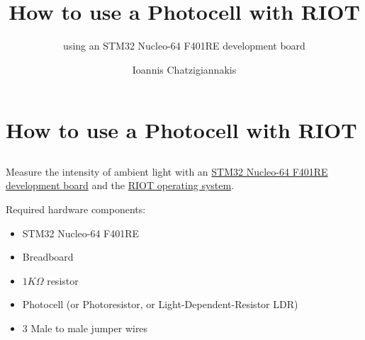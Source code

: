 \documentclass[aspectratio=169]{beamer}
\title[Lecture 1]{How to use a Photocell with RIOT}
\subtitle{using an STM32 Nucleo-64 F401RE development board}
\author[I.Chatzigiannakis]{Ioannis Chatzigiannakis}
\institute{\url{https://github.com/ichatz/riotos-apps}}
\date{}
\begin{document}
{

\frame{\titlepage}

}

\section{How to use a Photocell with RIOT}

\subsection{}

\begin{frame}{}

\begin{block}{}
Measure the intensity of ambient light with an \href{https://www.st.com/en/evaluation-tools/nucleo-f401re.html}{STM32 Nucleo-64 F401RE development board} and the \href{https://github.com/RIOT-OS/RIOT}{RIOT operating system}.
\end{block}

\bigskip

Required hardware components:

\begin{itemize}
	
\item STM32 Nucleo-64 F401RE

\item Breadboard

\item $1K\Omega$ resistor

\item Photocell (or Photoresistor, or Light-Dependent-Resistor LDR)

\item 3 Male to male jumper wires

\end{itemize}
\end{frame}
\end{document}
